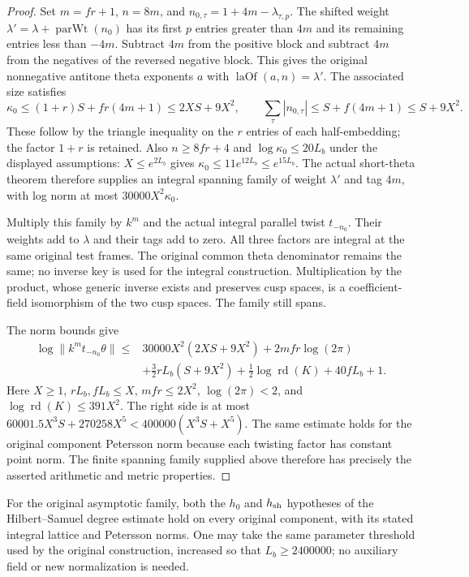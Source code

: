 \begin{proof}
Set $m=fr+1$, $n=8m$, and
$n_{0,\tau}=1+4m-\lambda_{\tau,p}$.
The shifted weight $\lambda'=\lambda+\operatorname{parWt}(n_0)$
has its first $p$ entries greater than $4m$ and its remaining
entries less than $-4m$.  Subtract $4m$ from the positive block
and subtract $4m$ from the negatives of the reversed negative
block.  This gives the original nonnegative antitone theta
exponents $a$ with $\operatorname{laOf}(a,n)=\lambda'$.
The associated size satisfies
\[
 \kappa_0\le(1+r)S+fr(4m+1)\le2XS+9X^2,
 \qquad
 \sum_\tau|n_{0,\tau}|\le S+f(4m+1)\le S+9X^2.
\]
These follow by the triangle inequality on the $r$ entries of
each half-embedding; the factor $1+r$ is retained.
Also $n\ge8fr+4$ and $\log\kappa_0\le20L_b$ under the displayed
assumptions: $X\le e^{2L_b}$ gives
$\kappa_0\le11e^{12L_b}\le e^{15L_b}$.
The actual short-theta theorem therefore supplies
an integral spanning family of weight $\lambda'$ and tag $4m$,
with log norm at most $30000X^2\kappa_0$.

Multiply this family by $k^m$ and the actual integral parallel
twist $t_{-n_0}$.  Their weights add to $\lambda$ and their tags
add to zero.  All three factors are integral at the same original
test frames.  The original common theta denominator remains the
same; no inverse key is used for the integral construction.
Multiplication by the product, whose generic inverse exists and
preserves cusp spaces, is a coefficient-field isomorphism of
the two cusp spaces.  The family still spans.

The norm bounds give
\[
 \begin{split}
 \log\|k^m t_{-n_0}\theta\|
 \le{}&30000X^2(2XS+9X^2)+2mfr\log(2\pi)\\
 &+\tfrac32rL_b(S+9X^2)
                 +\tfrac12\log\operatorname{rd}(K)+40fL_b+1.
 \end{split}
\]
Here $X\ge1$, $rL_b,fL_b\le X$,
$mfr\le2X^2$, $\log(2\pi)<2$, and
$\log\operatorname{rd}(K)\le391X^2$.
The right side is at most
$60001.5X^3S+270258X^5<400000(X^3S+X^5)$.
The same estimate holds for the original component Petersson
norm because each twisting factor has constant point norm.
The finite spanning family supplied above therefore has precisely
the asserted arithmetic and metric properties.
\end{proof}

\begin{corollary}\label{cor:actual-hs-short-families}
For the original asymptotic family, both the $h_0$ and
$h_{\rm sh}$ hypotheses of the Hilbert--Samuel degree estimate
hold on every original component, with its stated integral lattice
and Petersson norms.  One may take the same parameter threshold
used by the original construction, increased so that
$L_b\ge2400000$; no auxiliary field or new normalization is needed.
\end{corollary}

